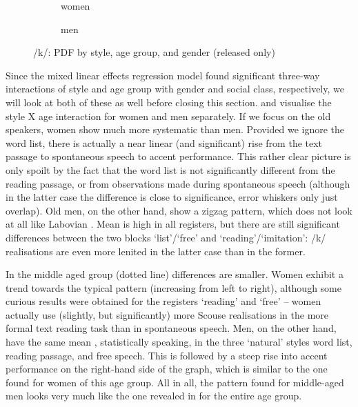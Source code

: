 \begin{figure}
	
	\begin{subfigure}{.49\textwidth}
		
			\resizebox{\linewidth}{!}{} 
		\caption{women}
		\label{fig.line.k.fem}
	\end{subfigure}
	\begin{subfigure}{.49\textwidth}
		
			\resizebox{\linewidth}{!}{} 
		\caption{men}
		\label{fig.line.k.mal}
	\end{subfigure}
	\caption{/k/: PDF by style, age group, and gender (released only)}
\end{figure}


\largerpage
Since the mixed linear effects regression model found significant three-way interactions of style and age group with gender and social class, respectively, we will look at both of these as well before closing this section.
 and  visualise the style X age interaction for women and men separately.
If we focus on the old speakers, women show much more systematic  than men.
Provided we ignore the word list, there is actually a near linear (and significant) rise from the text passage to spontaneous speech to accent performance.
This rather clear picture is only spoilt by the fact that the word list is not significantly different from the reading passage, or from observations made during spontaneous speech (although in the latter case the difference is close to significance, error whiskers only just overlap).
Old men, on the other hand, show a zigzag pattern, which does not look at all like Labovian .
Mean  is high in all registers, but there are still significant differences between the two blocks `list'/`free' and `reading'/`imitation': /k/ realisations are even more lenited in the latter case than in the former.

In the middle aged group (dotted line) differences are smaller.
Women exhibit a trend towards the typical  pattern (increasing  from left to right), although some curious results were obtained for the registers `reading' and `free' -- women actually use (slightly, but significantly) more Scouse realisations in the more formal text reading task than in spontaneous speech.
Men, on the other hand, have the same mean , statistically speaking, in the three `natural' styles word list, reading passage, and free speech.
This is followed by a steep rise into accent performance on the right-hand side of the graph, which is similar to the one found for women of this age group.
All in all, the pattern found for middle-aged men looks very much like the one revealed in  for the entire age group.

